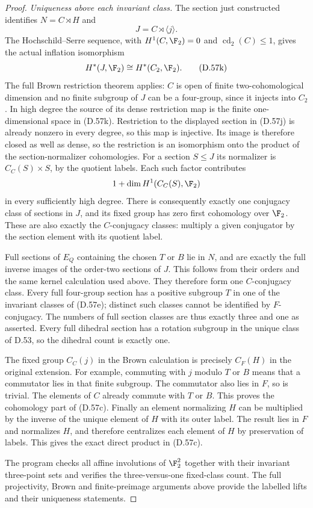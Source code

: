 \begin{proof}
\emph{Uniqueness above each invariant class.}
The section just constructed identifies
$N=C\rtimes H$ and
\[
                   J=C\rtimes\langle j\rangle .        \tag{D.57j}
\]
The Hochschild--Serre sequence, with
$H^1(C,\F_2)=0$ and
$\operatorname{cd}_2(C)\leq1$, gives
the actual inflation isomorphism
\[
                   H^*(J,\F_2)\cong H^*(C_2,\F_2).
                                                               \tag{D.57k}
\]
The full Brown restriction theorem
\cite[Theorem~2 and \S1.1]{A-KochloukovaZalesskii2007}
applies: $C$ is open of finite
two-cohomological dimension and no
finite subgroup of $J$ can be a
four-group, since it injects into
$C_2$.
In high degree the source of its
dense restriction map is the finite
one-dimensional space in (D.57k).
Restriction to the displayed section
in (D.57j) is already nonzero in
every degree, so this map is injective.
Its image is therefore closed as
well as dense, so the restriction
is an isomorphism onto the product
of the section-normalizer cohomologies.
For a section $S\leq J$ its normalizer
is $C_C(S)\times S$, by the quotient
labels. Each such factor contributes
\[
                          1+\dim H^1(C_C(S),\F_2)
\]
in every sufficiently high degree.
There is consequently exactly one
conjugacy class of sections in $J$,
and its fixed group has zero first
cohomology over $\F_2$.
These are also exactly the
$C$-conjugacy classes: multiply a
given conjugator by the section
element with its quotient label.

Full sections of $E_Q$ containing
the chosen $T$ or $B$ lie in $N$,
and are exactly the full inverse
images of the order-two sections
of $J$. This follows from their
orders and the same kernel calculation
used above.
They therefore form one $C$-conjugacy
class. Every full four-group section
has a positive subgroup $T$ in one
of the invariant classes of
(D.57e); distinct such classes
cannot be identified by $F$-conjugacy.
The numbers of full section classes
are thus exactly three and one
as asserted. Every full dihedral
section has a rotation subgroup
in the unique class of D.53, so
the dihedral count is exactly one.

The fixed group $C_C(j)$ in the
Brown calculation is precisely
$C_F(H)$ in the original extension.
For example, commuting with $j$
modulo $T$ or $B$ means that a
commutator lies in that finite
subgroup. The commutator also lies
in $F$, so is trivial. The elements
of $C$ already commute with $T$
or $B$. This proves the cohomology
part of (D.57c).
Finally an element normalizing $H$
can be multiplied by the inverse
of the unique element of $H$ with
its outer label. The result lies
in $F$ and normalizes $H$, and
therefore centralizes each element
of $H$ by preservation of labels.
This gives the exact direct product
in (D.57c).

The program
checks all affine involutions of
$\F_2^2$ together with their invariant
three-point sets and verifies the
three-versus-one fixed-class count.
The full projectivity, Brown and
finite-preimage arguments above
provide the labelled lifts and
their uniqueness statements.
\end{proof}

